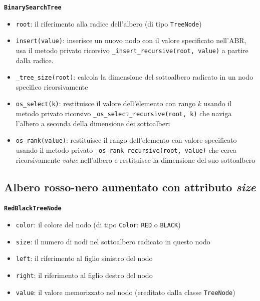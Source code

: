 \documentclass[onecolumn]{article}
\begin{document}
{\setlength{\parindent}{0em} \texttt{\textbf{BinarySearchTree}}}
\begin{itemize}
	\setlength\itemsep{0em}
	\item \verb|root|: il riferimento alla radice dell'albero (di tipo \texttt{TreeNode})
	\item \verb|insert(value)|: inserisce un nuovo nodo con il valore specificato nell'ABR, usa il metodo privato ricorsivo \verb|_insert_recursive(root, value)| a partire dalla radice.
	\item \verb|_tree_size(root)|: calcola la dimensione del sottoalbero radicato in un nodo specifico ricorsivamente
	\item \verb|os_select(k)|: restituisce il valore dell'elemento con rango $k$ usando il metodo privato ricorsivo \verb|_os_select_recursive(root, k)| che naviga l'albero a seconda della dimensione dei sottoalberi 
	\item \verb|os_rank(value)|: restituisce il rango dell'elemento con valore specificato  usando il metodo privato \verb|_os_rank_recursive(root, value)| che cerca ricorsivamente \textit{value} nell'albero e restituisce la dimensione del suo sottoalbero
\end{itemize}

\subsection{Albero rosso-nero aumentato con attributo \textit{size}}
\texttt{\textbf{RedBlackTreeNode}}
\begin{itemize}
	\setlength\itemsep{0em}
	\item \verb|color|: il colore del nodo (di tipo \texttt{Color}: \texttt{RED} o \texttt{BLACK})
	\item \verb|size|: il numero di nodi nel sottoalbero radicato in questo nodo
	\item \verb|left|: il riferimento al figlio sinistro del nodo
	\item \verb|right|: il riferimento al figlio destro del nodo
	\item \verb|value|: il valore memorizzato nel nodo (ereditato dalla classe \texttt{TreeNode})
\end{itemize}
\end{document}
